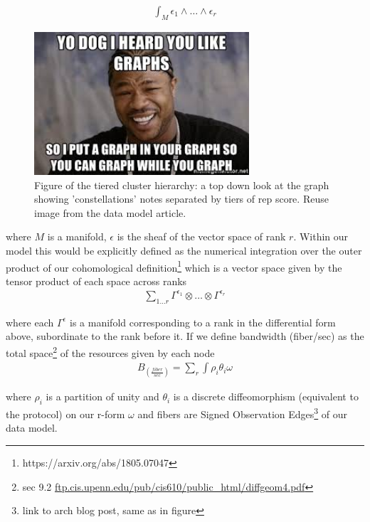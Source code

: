 \documentclass{article}
\begin{document}
\begin{equation*} \label{eq1}
\begin{split}
\int_M \epsilon_1 \wedge \dots \wedge \epsilon_r
\end{split}
\end{equation*}

\begin{figure}[h]
\caption{Figure of the tiered cluster hierarchy: a top down look at the graph showing 'constellations' notes separated by tiers of rep score. Reuse image from the data model article.}
\includegraphics[width=8cm]{yo_dawg}
\centering
\end{figure}

where $M$ is a manifold, $\epsilon$ is the sheaf of the vector space of rank $r$. Within our model this would be explicitly defined as the numerical integration over the outer product of our cohomological definition\footnote{https://arxiv.org/abs/1805.07047} which is a vector space given by the tensor product of each space across ranks
\begin{equation*} \label{eq1}
\begin{split}
\sum_{1 \dots r} \Gamma^{\epsilon_1} \otimes \dots \otimes \Gamma^{\epsilon_r}
\end{split}
\end{equation*}

where each $\Gamma^{\epsilon}$ is a manifold corresponding to a rank in the differential form above, subordinate to the rank before it. If we define bandwidth (fiber/sec) as the total space\footnote{sec 9.2 \url{ftp.cis.upenn.edu/pub/cis610/public_html/diffgeom4.pdf}} of the resources given by each node
\begin{equation*} \label{eq1}
\begin{split}
B_{(\frac{fiber}{sec})} = \sum_{r} \int \rho_i \theta_i \omega
\end{split}
\end{equation*}

where $\rho_i$ is a partition of unity and $\theta_i$ is a discrete diffeomorphism (equivalent to the protocol) on our r-form $\omega$ and fibers are Signed Observation Edges\footnote{link to arch blog post, same as in figure} of our data model. 
\end{document}
